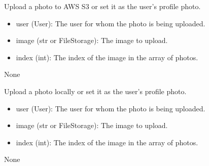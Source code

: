 \documentclass[letterpaper,10pt,english]{sphinxmanual}
\begin{document}
\begin{fulllineitems}
\label{\detokenize{routes.images:routes.images.routes.upload_photo_aws}}
\pysigstartsignatures
{}
\pysigstopsignatures
\sphinxAtStartPar
Upload a photo to AWS S3 or set it as the user’s profile photo.
\begin{description}
\begin{itemize}
\item {} 
\sphinxAtStartPar
user (User): The user for whom the photo is being uploaded.

\item {} 
\sphinxAtStartPar
image (str or FileStorage): The image to upload.

\item {} 
\sphinxAtStartPar
index (int): The index of the image in the array of photos.

\end{itemize}

\sphinxAtStartPar
None

\end{description}

\end{fulllineitems}


\begin{fulllineitems}
\label{\detokenize{routes.images:routes.images.routes.upload_photo_local}}
\pysigstartsignatures
{}
\pysigstopsignatures
\sphinxAtStartPar
Upload a photo locally or set it as the user’s profile photo.
\begin{description}
\begin{itemize}
\item {} 
\sphinxAtStartPar
user (User): The user for whom the photo is being uploaded.

\item {} 
\sphinxAtStartPar
image (str or FileStorage): The image to upload.

\item {} 
\sphinxAtStartPar
index (int): The index of the image in the array of photos.

\end{itemize}

\sphinxAtStartPar
None

\end{description}

\end{fulllineitems}
\end{document}
